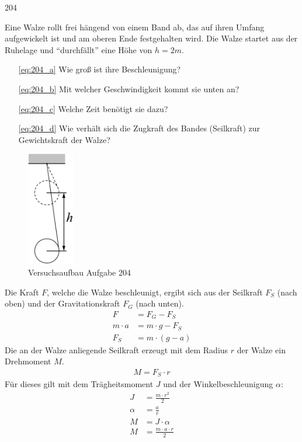 \begin{auf}
    204
\end{auf}
Eine Walze rollt frei hängend von einem Band ab, das auf ihren Umfang aufgewickelt ist und am oberen Ende festgehalten wird. Die Walze startet aus der Ruhelage und \enquote{durchfällt} eine Höhe von $h=2m$.
\begin{enumerate}
    \item[\ref{eq:204_a}] Wie groß ist ihre Beschleunigung?
    \item[\ref{eq:204_b}] Mit welcher Geschwindigkeit kommt sie unten an?
    \item[\ref{eq:204_c}] Welche Zeit benötigt sie dazu?
    \item[\ref{eq:204_d}] Wie verhält sich die Zugkraft des Bandes (Seilkraft) zur Gewichtskraft der Walze?
\end{enumerate}
\begin{figure}[h]
    \centering
    \includegraphics[height=5cm]{images/204_0.png}
    \caption{Versuchsaufbau Aufgabe 204}
\end{figure}
Die Kraft $F$, welche die Walze beschleunigt, ergibt sich aus der Seilkraft $F_S$ (nach oben) und der Gravitationskraft $F_G$ (nach unten).
\begin{align}
    F&=F_G-F_S					\nonumber\\
    m\cdot a &= m\cdot g - F_S	\nonumber\\
    F_S&=m\cdot(g-a)			\label{eq:204_force}
\end{align}
Die an der Walze anliegende Seilkraft erzeugt mit dem Radius $r$ der Walze ein Drehmoment $M$.
\begin{align}
    M=F_S\cdot r	\label{eq:204_torque0}
\end{align}
Für dieses gilt mit dem Trägheitsmoment $J$ und der Winkelbeschleunigung $\alpha$:
\begin{align}
    J&=\frac{m\cdot r^2}{2}			\nonumber\\
    \alpha&=\frac{a}{r}				\nonumber\\
    M&=J\cdot \alpha				\nonumber\\
    M&=\frac{m\cdot a\cdot r}{2}	\label{eq:204_torque1}
\end{align}
